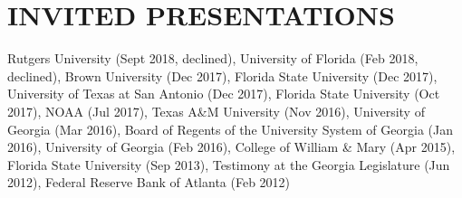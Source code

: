\documentclass[letterpaper,11pt]{article}
\begin{document}
\section{INVITED PRESENTATIONS}
Rutgers University (Sept 2018, declined), University of Florida (Feb 2018, declined), Brown University (Dec 2017), Florida State University (Dec 2017), University of Texas at San Antonio (Dec 2017), Florida State University (Oct 2017), NOAA (Jul 2017), Texas A\&M University (Nov 2016), University of Georgia (Mar 2016), Board of Regents of the University System of Georgia (Jan 2016), University of Georgia (Feb 2016), College of William \& Mary (Apr 2015), Florida State University (Sep 2013), Testimony at the Georgia Legislature (Jun 2012), Federal Reserve Bank of Atlanta (Feb 2012)

%

\end{document}
